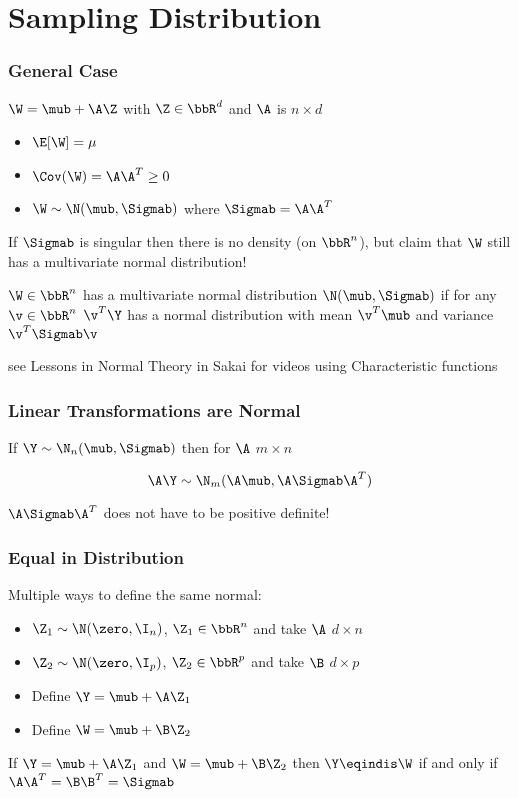 \documentclass[handout]{beamer}
\begin{document}
\section{Sampling Distribution}

\begin{frame} \frametitle{General Case}
$\W = \mub + \A \Z$  with $\Z \in \bbR^d$ and $\A$ is $n \times d$ \pause
\begin{itemize}
\item $\E[\W] = \mu$ \pause
\item $\Cov(\W) = \A \A^T \ge 0$ \pause
\item $\W \sim \N(\mub, \Sigmab)$ where $\Sigmab = \A \A^T$
\end{itemize}
  If $\Sigmab$ is singular then there is no density (on $\bbR^n$), but claim that
  $\W$ still has a multivariate normal distribution!  \pause

 \begin{definition}
  $\W \in \bbR^n$ has a  multivariate normal distribution $\N(\mub,
  \Sigmab)$ if for any $\v \in \bbR^n$ $\v^T\Y$ has a normal
  distribution with mean $\v^T\mub$ and variance $\v^T\Sigmab \v$
  \end{definition} \pause

see Lessons in Normal Theory in Sakai for videos using Characteristic functions
\end{frame}

\begin{frame} \frametitle{Linear Transformations are Normal}

If $\Y \sim \N_n(\mub, \Sigmab)$ then for $\A$ $m \times n$

$$\A \Y \sim \N_m(\A \mub, \A \Sigmab \A^T)$$


$\A \Sigmab \A^T$ does not have to be positive definite!
  


\end{frame}
\begin{frame}
  \frametitle{Equal in Distribution}
  Multiple ways to define the same normal: \pause

  \begin{itemize}
  \item 
$\Z_1 \sim \N(\zero, \I_n)$, $\Z_1 \in \bbR^n$  and take $\A$ $d
\times n$ \pause
\item $\Z_2 \sim \N(\zero, \I_p)$,  $\Z_2 \in \bbR^p$  and take $\B$ $d
\times p$ \pause
\item Define $\Y = \mub + \A \Z_1$ \pause
\item Define $\W = \mub + \B \Z_2$ \pause
  \end{itemize}
  \begin{theorem}
    If  $\Y = \mub + \A \Z_1$ and $\W = \mub + \B \Z_2$ then $\Y
    \eqindis \W$ if and only if $\A \A^T = \B \B^T = \Sigmab$
  \end{theorem}
\end{frame}
\end{document}
